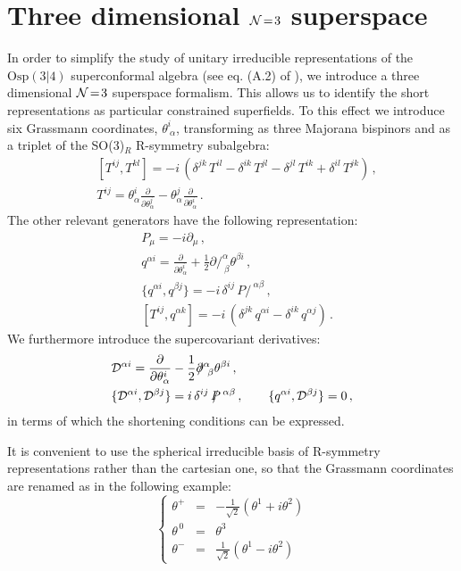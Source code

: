 \documentclass[a4paper,12pt]{article}
\newcommand{\ft}[2]{{\textstyle\frac{#1}{#2}}}
\begin{document}
\section{Three dimensional ${\cal N}\!=\!3$ superspace}\label{N=3supspace}
In order to simplify the study of unitary irreducible representations
of the $\mathrm{Osp(3|4)}$ superconformal algebra (see eq. (A.2) of
\cite{susp}), we introduce a three dimensional ${\cal N}\!=\!3$
superspace formalism.
This allows us to identify the short representations as
particular constrained superfields.
To this effect we introduce six Grassmann coordinates,
$\theta^i_{\ \alpha}$, transforming as three Majorana bispinors
and as a triplet of the SO(3)$_R$ R-symmetry subalgebra:
\begin{eqnarray}
&[T^{ij}, T^{kl}] = -i\,(\delta^{jk}\,T^{il}-\delta^{ik}\,T^{jl}-
\delta^{jl}\,T^{ik}+\delta^{il}\,T^{jk})
\,, \nonumber \\
&T^{ij} = \theta^i_\alpha\frac{\partial}{\partial\theta_\alpha^j}-
\theta^j_\alpha\frac{\partial}{\partial\theta_\alpha^i}\,.
\end{eqnarray}
The other relevant generators have the following representation:
\begin{eqnarray}
&P_\mu=-i\partial_\mu\,,\nonumber\\
&q^{\alpha i}=\frac{\partial}{\partial\theta_\alpha^i}+
\frac{1}{2}\partial\!\!\!/^\alpha_{\ \beta}\theta^{\beta i}\,,\nonumber\\
&\{q^{\alpha i}, q^{\beta j} \} = - i\, \delta^{ij}\,
P\!\!\!\!/^{\ \alpha\beta}\,, \nonumber \\
&[T^{ij}, q^{\alpha k}] =
-i\, (\delta^{jk}\, q^{\alpha i} - \delta^{ik}\, q^{\alpha j} )\,.
\end{eqnarray}
We furthermore introduce the supercovariant derivatives:
\begin{eqnarray}
&{\cal D}^{\alpha i}=\frac{\partial}{\partial\theta_\alpha^i}-
\frac{1}{2}\partial\!\!\!/^\alpha_{\ \beta}\theta^{\beta i}\,,\nonumber\\
&\{{\cal D}^{\alpha i}, {\cal D}^{\beta j} \} = i\, \delta^{ij}\,
P\!\!\!\!/^{\ \alpha\beta}\,,\qquad\{q^{\alpha i}, {\cal D}^{\beta j}\}=0\,,
\end{eqnarray}
in terms of which the shortening conditions can be expressed.
\par
It is convenient to use the spherical irreducible basis of
R-symmetry representations rather than the cartesian one, so that
the Grassmann coordinates are renamed as in the following example:
\begin{equation}
\left\{\begin{array}{ccl}
\theta^+&=&-\ft{1}{\sqrt 2}(\theta^1+i\theta^2)\\
\theta^{\,0\,}&=&\theta^3\\
\theta^-&=&\ft{1}{\sqrt 2}(\theta^1-i\theta^2)
\end{array}\right.
\end{equation}
\end{document}
